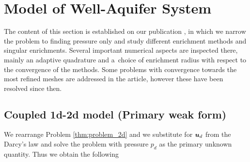 \section{Model of Well-Aquifer System} 
\label{sec:model_aquifer}
The content of this section is established on our publication \cite{exner_2016}, in which 
we narrow the problem to finding pressure only and study different enrichment methods and singular enrichments.
Several important numerical aspects are inspected there, mainly an adaptive quadrature and
a~choice of enrichment radius with respect to the convergence of the methods.
Some problems with convergence towards the most refined meshes are addressed in the article,
however these have been resolved since then.



\subsection{Coupled 1d-2d model (Primary weak form)}

We rearrange Problem \ref{thm:problem_2d} and we substitute for $\mathbf{\boldsymbol{u}}_d$ from the Darcy's law and solve the problem
with pressure $p_d$ as the primary unknown quantity. Thus we obtain the following


